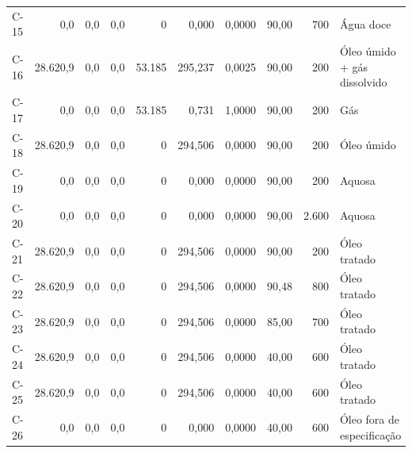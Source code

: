 \documentclass[11pt,a4paper]{article}
\numberwithin{equation}{section}
\numberwithin{table}{section}
\numberwithin{figure}{section}
\begin{document}
{\begin{longtable}{lrrrrrrrrL{2.5cm}}
C-15 & 0,0 & 0,0 & 0,0 & 0 & 0,000 & 0,0000 & 90,00 & 700 & {\scriptsize Água doce}\\
C-16 & 28.620,9 & 0,0 & 0,0 & 53.185 & 295,237 & 0,0025 & 90,00 & 200 & {\scriptsize Óleo úmido + gás dissolvido}\\
C-17 & 0,0 & 0,0 & 0,0 & 53.185 & 0,731 & 1,0000 & 90,00 & 200 & {\scriptsize Gás}\\
C-18 & 28.620,9 & 0,0 & 0,0 & 0 & 294,506 & 0,0000 & 90,00 & 200 & {\scriptsize Óleo úmido}\\
C-19 & 0,0 & 0,0 & 0,0 & 0 & 0,000 & 0,0000 & 90,00 & 200 & {\scriptsize Aquosa}\\
C-20 & 0,0 & 0,0 & 0,0 & 0 & 0,000 & 0,0000 & 90,00 & 2.600 & {\scriptsize Aquosa}\\
C-21 & 28.620,9 & 0,0 & 0,0 & 0 & 294,506 & 0,0000 & 90,00 & 200 & {\scriptsize Óleo tratado}\\
C-22 & 28.620,9 & 0,0 & 0,0 & 0 & 294,506 & 0,0000 & 90,48 & 800 & {\scriptsize Óleo tratado}\\
C-23 & 28.620,9 & 0,0 & 0,0 & 0 & 294,506 & 0,0000 & 85,00 & 700 & {\scriptsize Óleo tratado}\\
C-24 & 28.620,9 & 0,0 & 0,0 & 0 & 294,506 & 0,0000 & 40,00 & 600 & {\scriptsize Óleo tratado}\\
C-25 & 28.620,9 & 0,0 & 0,0 & 0 & 294,506 & 0,0000 & 40,00 & 600 & {\scriptsize Óleo tratado}\\
C-26 & 0,0 & 0,0 & 0,0 & 0 & 0,000 & 0,0000 & 40,00 & 600 & {\scriptsize Óleo fora de especificação}\\
\bottomrule\end{longtable}}
\end{document}
